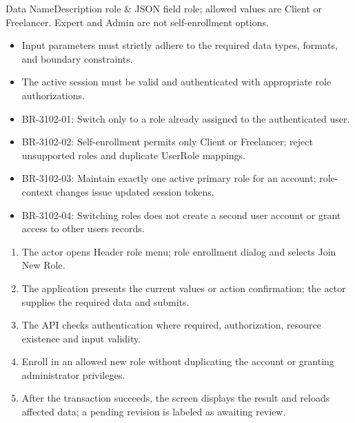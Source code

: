 
\begin{specdatatable}{Data Name}{Description}
role & JSON field role; allowed values are Client or Freelancer. Expert and Admin are not self-enrollment options.\\ \hline
\end{specdatatable}

\begin{itemize}[leftmargin=1.6em,topsep=3pt,itemsep=2pt,parsep=0pt,label=$\bullet$]
    \item Input parameters must strictly adhere to the required data types, formats, and boundary constraints.
    \item The active session must be valid and authenticated with appropriate role authorizations.
\end{itemize}

\begin{itemize}[leftmargin=1.6em,topsep=3pt,itemsep=2pt,parsep=0pt,label=$\bullet$]\brrulelist
    \item BR-3102-01: Switch only to a role already assigned to the authenticated user.
    \item BR-3102-02: Self-enrollment permits only Client or Freelancer; reject unsupported roles and duplicate UserRole mappings.
    \item BR-3102-03: Maintain exactly one active primary role for an account; role-context changes issue updated session tokens.
    \item BR-3102-04: Switching roles does not create a second user account or grant access to other users records.
\end{itemize}

\begin{enumerate}[leftmargin=1.8em,topsep=3pt,itemsep=2pt,parsep=0pt]
    \item The actor opens Header role menu; role enrollment dialog and selects Join New Role.
    \item The application presents the current values or action confirmation; the actor supplies the required data and submits.
    \item The API checks authentication where required, authorization, resource existence and input validity.
    \item Enroll in an allowed new role without duplicating the account or granting administrator privileges.
    \item After the transaction succeeds, the screen displays the result and reloads affected data; a pending revision is labeled as awaiting review.
\end{enumerate}

